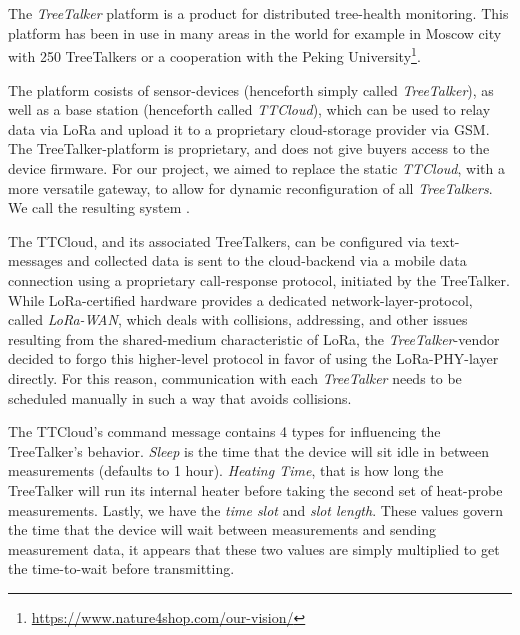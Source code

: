 \section{\ttt}
\label{sec:treetalker}

The \emph{TreeTalker} platform is a product for distributed tree-health monitoring.
This platform has been in use in many areas in the world for example in Moscow city with 250 TreeTalkers or a cooperation with the Peking University\footnote{\url{https://www.nature4shop.com/our-vision/}}.

The platform cosists of sensor-devices (henceforth simply called \textit{TreeTalker}), as well as a base station (henceforth called \textit{TTCloud}), which can be used to relay data via LoRa and upload it to a proprietary cloud-storage provider via GSM.
The TreeTalker-platform is proprietary, and does not give buyers access to the device firmware.
For our project, we aimed to replace the static \textit{TTCloud}, with a more versatile gateway, to allow for dynamic reconfiguration of all \textit{TreeTalkers}.
We call the resulting system \ttt.

The TTCloud, and its associated TreeTalkers, can be configured via text-messages and collected data is sent to the cloud-backend via a mobile data connection using a proprietary call-response protocol, initiated by the TreeTalker.
While LoRa-certified hardware provides a dedicated network-layer-protocol, called \textit{LoRa-WAN}, which deals with collisions, addressing, and other issues resulting from the shared-medium characteristic of LoRa, the \textit{TreeTalker}-vendor decided to forgo this higher-level protocol in favor of using the LoRa-PHY-layer directly.
For this reason, communication with each \textit{TreeTalker} needs to be scheduled manually in such a way that avoids collisions.


The TTCloud's command message contains 4 types for influencing the TreeTalker's behavior.
\textit{Sleep} is the time that the device will sit idle in between measurements (defaults to 1 hour).
\textit{Heating Time}, that is how long the TreeTalker will run its internal heater before taking the second set of heat-probe measurements.
Lastly, we have the \textit{time slot} and \textit{slot length}.
These values govern the time that the device will wait between measurements and sending measurement data, it appears that these two values are simply multiplied to get the time-to-wait before transmitting.

